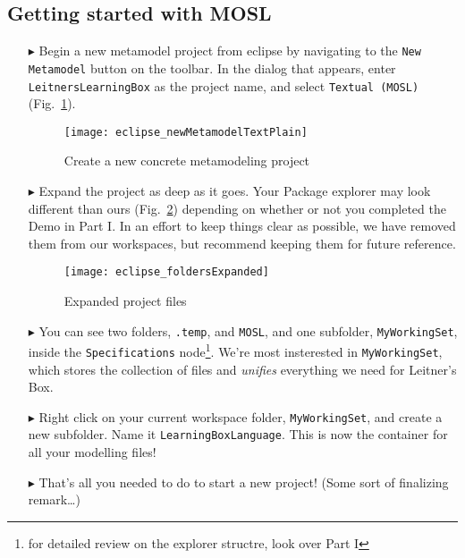 \clearpage
\subsection{Getting started with MOSL}
\texHeader
\hypertarget{static:starting tex}{}

\begin{itemize}

\item[$\blacktriangleright$] \hypertarget{static tex}{Begin a} new metamodel project from eclipse by navigating to the \texttt{New Metamodel} button on the
toolbar. In the dialog that appears, enter \texttt{LeitnersLearningBox} as the project name, and select \texttt{Textual (MOSL)}  (Fig.~\ref{fig:new_project}).

\begin{figure}[htbp]
	\centering
  \texttt{[image: eclipse\_newMetamodelTextPlain]}
	\caption{Create a new concrete metamodeling project}
	\label{fig:new_project}
\end{figure}

\item[$\blacktriangleright$] Expand the project as deep as it goes. Your Package explorer may look different than ours (Fig.~\ref{fig:expanded_folders})
depending on whether or not you completed the Demo in Part I. In an effort to keep things clear as possible, we have removed them from our workspaces, but
recommend keeping them for future reference.

\begin{figure}[htbp]
	\centering
  \texttt{[image: eclipse\_foldersExpanded]}
	\caption{Expanded project files}
	\label{fig:expanded_folders}
\end{figure} 

\clearpage
\item[$\blacktriangleright$] You can see two folders, \texttt{.temp}, and \texttt{MOSL}, and one subfolder, \texttt{MyWorkingSet}, inside the
\texttt{Specifications} node\footnote{for detailed review on the explorer structre, look over Part I}. We're most insterested in \texttt{MyWorkingSet}, which
stores the collection of files and  \emph{unifies} everything we need for Leitner's Box.

\item[$\blacktriangleright$] Right click on your current workspace folder, \texttt{MyWorkingSet}, and create a new subfolder. Name it
\texttt{LearningBoxLanguage}. This is now the container for all your modelling files!


\item[$\blacktriangleright$] That's all you needed to do to start a new project! (Some sort of finalizing remark\ldots)


\end{itemize}

